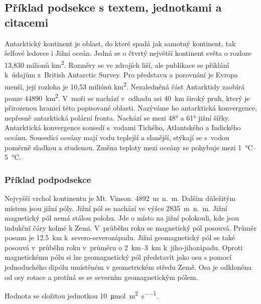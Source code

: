 \documentclass[a4paper, 12pt, oneside]{article}
\begin{document}
\subsection{Příklad podsekce s textem, jednotkami a citacemi}
Antarktický kontinent je oblast, do které spadá jak samotný kontinent, tak šelfové ledovce i Jižní oceán. Jedná se o čtvrtý největší kontinent světa o rozloze 13,830 milionů \unit{\km\squared}. Rozměry se ve zdrojích liší, ale publikace \parencite{prosek2013antarktida} se přiklání k údajům z British Antarctic Survey. Pro představu a porovnání je Evropa menší, její rozloha je 10,53 miliónů \unit{\km\squared}. Nezaledněná část Antarktidy zaobírá pouze \qty{44890}{\km\squared}. V moři se nachází v odhadu asi \qty{40}{\km} široký pruh, který je přirozenou hranicí této popisované oblasti. Nazýváme ho antarktická konvergence, nepřesně antarktická polární fronta. Nachází se mezi \ang{48} a \ang{61} jižní šířky. Antarktická konvergence sousedí s vodami Tichého, Atlantského a Indického oceánu. Sousedící oceány mají vodu teplejší a slanější, stýkají se s vodou poměrně sladkou a studenou. Změna teploty mezi oceány se pohybuje mezi \qtyrange{1}{5}{\celsius}. \parencite{prosek2013antarktida,peck2014oceanography}

\subsubsection{Příklad podpodsekce}
Nejvyšší vrchol kontinentu je Mt. Vinson. 4892~m~n.~m. Dalším důležitým místem jsou jižní póly. Jižní pól se nachází ve výšce 2835~m~n.~m. Jižní magnetický pól nemá stálou polohu. Jde o místo na jižní polokouli, kde jsou indukční čáry kolmé k Zemi. V průběhu roku se magnetický pól posouvá. Průměr posunu je \qty{12.5}{km} k severo-severozápadu. Jižní geomagnetický pól se také posouvá v průběhu roku v průměru o \qtyrange{2}{3}{\km} k jiho-jihozápadu. Oproti magnetickému pólu si lze geomagnetický pól představit jako osu s pomocí jednoduchého dipólu umístěném v geometrickém středu Země. Osa je odkloněna od osy rotace a protíná se se severním geomagnetickým pólem. \parencite{mcelhinny1998magnetic,prosek2013antarktida,wiki:xxx}

Hodnota se složitou jednotkou \qty{10}{\micro\mole\per\metre\squared\per\second}.
\end{document}

